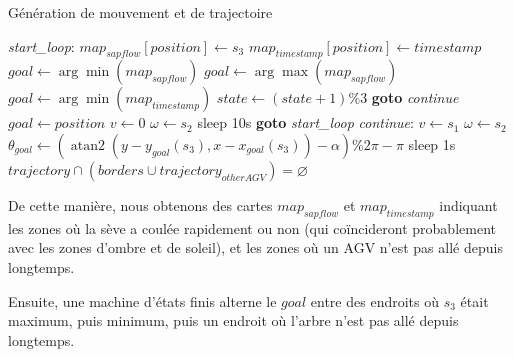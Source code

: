 \documentclass[french,A4paper,]{book}
\begin{document}
\begin{algorithm}
\caption{Génération de mouvement et de trajectoire}
\label{alg:goal}
\begin{algorithmic}[1]

\Loop
    \State \emph{start\_loop}:
    \State $map_{sap flow}[position] \gets s_3$
    \State $map_{timestamp}[position] \gets timestamp$
                \State $goal \gets \arg\min(map_{sap flow})$
                \State $goal \gets \arg\max(map_{sap flow})$
            \Else
                \State $goal \gets \arg\min(map_{timestamp})$
            \EndIf
            \State $state \gets (state + 1) \% 3$
                \State \textbf{goto} \emph{continue}
            \EndIf
        \EndFor
        \State $goal \gets position$
        \State $v \gets 0$
        \State $\omega \gets s_2$
        \State sleep 10s
        \State \textbf{goto} \emph{start\_loop}
    \EndIf
    \State \emph{continue}:
    \State $v \gets s_1$
    \State $\omega \gets s_2$
    \State $\theta_{goal} \gets \left(\operatorname{atan2}\left(y - y_{goal}(s_3), x - x_{goal}(s_3)\right) -
    \alpha\right) \% 2 \pi - \pi$
    \State sleep 1s
\EndLoop
{}
    \State \Return $trajectory \cap (borders \cup {trajectory}_{other AGV}) = \varnothing$
\EndProcedure

\end{algorithmic}
\end{algorithm}

De cette manière, nous obtenons des cartes \(map_{sapflow}\) et
\(map_{timestamp}\) indiquant les zones où la sève a coulée rapidement
ou non (qui coïncideront probablement avec les zones d'ombre et de
soleil), et les zones où un AGV n'est pas allé depuis longtemps.

Ensuite, une machine d'états finis alterne le \(goal\) entre des
endroits où \(s_3\) était maximum, puis minimum, puis un endroit où
l'arbre n'est pas allé depuis longtemps.
\end{document}

